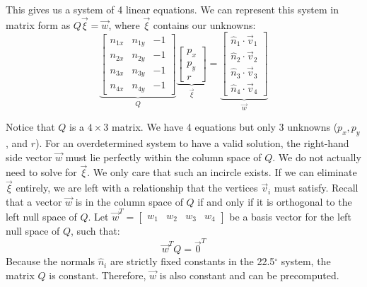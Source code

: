 \documentclass[11pt]{article}
\begin{document}
This gives us a system of 4 linear equations. We can represent this system in matrix form as $Q \vec{\xi} = \vec{w}$, where $\vec{\xi}$ contains our unknowns:
\begin{equation}
    \underbrace{
    \begin{bmatrix}
    n_{1x} & n_{1y} & -1 \\
    n_{2x} & n_{2y} & -1 \\
    n_{3x} & n_{3y} & -1 \\
    n_{4x} & n_{4y} & -1
    \end{bmatrix}
    }_{Q}
    \underbrace{
    \begin{bmatrix}
    p_x \\
    p_y \\
    r
    \end{bmatrix}
    }_{\vec{\xi}}
    =
    \underbrace{
    \begin{bmatrix}
    \hat{n}_1 \cdot \vec{v}_1 \\
    \hat{n}_2 \cdot \vec{v}_2 \\
    \hat{n}_3 \cdot \vec{v}_3 \\
    \hat{n}_4 \cdot \vec{v}_4
    \end{bmatrix}
    }_{\vec{w}}
\end{equation}

Notice that $Q$ is a $4 \times 3$ matrix. We have 4 equations but only 3 unknowns ($p_x, p_y$, and $r$). For an overdetermined system to have a valid solution, the right-hand side vector $\vec{w}$ must lie perfectly within the column space of $Q$. We do not actually need to solve for $\vec{\xi}$. We only care that such an incircle exists. If we can eliminate $\vec{\xi}$ entirely, we are left with a relationship that the vertices $\vec{v}_i$ must satisfy.
Recall that a vector $\vec{w}$ is in the column space of $Q$ if and only if it is orthogonal to the left null space of $Q$. Let $\vec{w}^T = \begin{bmatrix} w_1 & w_2 & w_3 & w_4 \end{bmatrix}$ be a basis vector for the left null space of $Q$, such that:
\begin{equation}
    \vec{w}^T Q = \vec{0}^T
\end{equation}
Because the normals $\hat{n}_i$ are strictly fixed constants in the 22.5$^\circ$ system, the matrix $Q$ is constant. Therefore, $\vec{w}$ is also constant and can be precomputed.
\end{document}
